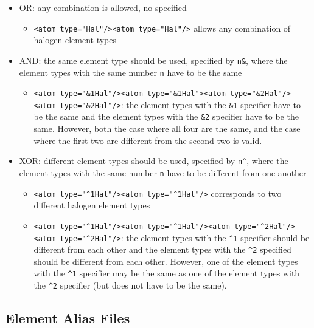 \documentclass[a4paper,11pt]{article}
\begin{document}
\begin{itemize}
  \item OR: any combination is allowed, no specified
  \begin{itemize}
    \item \texttt{<atom type="Hal"/><atom type="Hal"/>} allows any combination of halogen element types
  \end{itemize}
  \item AND: the same element type should be used, specified by \texttt{n\&}, where the element types with the same number \texttt{n} have to be the same
  \begin{itemize}
    \item \begin{sloppypar}\texttt{<atom type="\&{}1Hal"/><atom type="\&{}1Hal"><atom type="\&{}2Hal"/><atom type="\&{}2Hal"/>}: the element types with the \texttt{\&1} specifier have to be the same and the element types with the \texttt{\&2} specifier have to be the same. However, both the case where all four are the same, and the case where the first two are different from the second two is valid.\end{sloppypar}
  \end{itemize}
  \item XOR: different element types should be used, specified by \texttt{n\^}, where the element types with the same number \texttt{n} have to be different from one another
  \begin{itemize}
    \item \texttt{<atom type="\^{}1Hal"/><atom type="\^{}1Hal"/>} corresponds to two different halogen element types
    \item \begin{sloppypar}\texttt{<atom type="\^{}1Hal"/><atom type="\^{}1Hal"/><atom type="\^{}2Hal"/><atom type="\^{}2Hal"/>}: the element types with the \texttt{\^{}1} specifier should be different from each other and the element types with the \texttt{\^{}2} specified should be different from each other. However, one of the element types with the \texttt{\^{}1} specifier may be the same as one of the element types with the \texttt{\^{}2} specifier (but does not have to be the same).\end{sloppypar}
  \end{itemize}
\end{itemize}

\subsection{Element Alias Files}\label{sec:alias}
\end{document}
